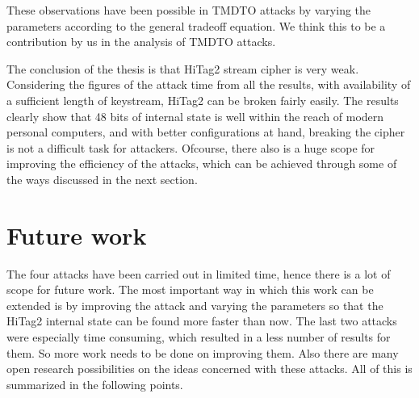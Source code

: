 These observations have been possible in TMDTO attacks by varying the parameters according to the general tradeoff equation. We think this to be a contribution by us in the analysis of TMDTO attacks.

The conclusion of the thesis is that HiTag2 stream cipher is very weak. Considering the figures of the attack time from all the results, with availability of a sufficient length of keystream, HiTag2 can be broken fairly easily. The results clearly show that 48 bits of internal state is well within the reach of modern personal computers, and with better configurations at hand, breaking the cipher is not a difficult task for attackers. Ofcourse, there also is a huge scope for improving the efficiency of the attacks, which can be achieved through some of the ways discussed in the next section. 

\section{Future work}

The four attacks have been carried out in limited time, hence there is a lot of scope for future work. The most important way in which this work can be extended is by improving the attack and varying the parameters so that the HiTag2 internal state can be found more faster than now. The last two attacks were especially time consuming, which resulted in a less number of results for them. So more work needs to be done on improving them. Also there are many open research possibilities on the ideas concerned with these attacks. All of this is summarized in the following points. 

